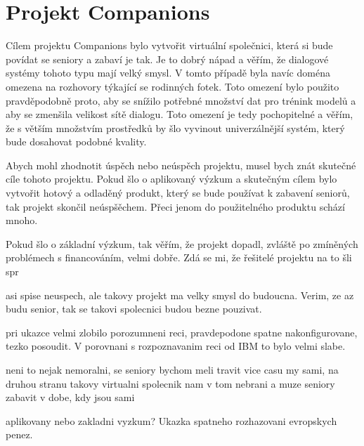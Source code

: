 \documentclass[12pt,a4paper]{report}
\begin{document}
\section*{Projekt Companions}

Cílem projektu Companions bylo vytvořit virtuální společnici, která si bude
povídat se seniory a zabaví je tak. Je to dobrý nápad a věřím, že dialogové
systémy tohoto typu mají velký smysl. V tomto případě byla navíc doména omezena
na rozhovory týkající se rodinných fotek. Toto omezení bylo použito
pravděpodobně proto, aby se snížilo potřebné množství dat pro trénink modelů a
aby se zmenšila velikost sítě dialogu. Toto omezení je tedy pochopitelné a
věřím, že s větším množstvím prostředků by šlo vyvinout univerzálnější systém,
který bude dosahovat podobné kvality.

Abych mohl zhodnotit úspěch nebo neúspěch projektu, musel bych znát skutečné
cíle tohoto projektu. Pokud šlo o aplikovaný výzkum a skutečným cílem bylo
vytvořit hotový a odladěný produkt, který se bude používat k zabavení seniorů,
tak projekt skončil neúspšěchem. Přeci jenom do použitelného produktu schází
mnoho.

Pokud šlo o základní výzkum, tak věřím, že projekt dopadl, zvláště po zmíněných 
problémech s financováním, velmi dobře. Zdá se mi, že řešitelé projektu 
na to šli spr


asi spise neuspech, ale takovy projekt ma velky smysl do budoucna. Verim, ze az budu
senior, tak se takovi spolecnici budou bezne pouzivat.

pri ukazce velmi zlobilo porozumneni reci, pravdepodone spatne nakonfigurovane, tezko posoudit.
V porovnani s rozpoznavanim reci od IBM to bylo velmi slabe. 

neni to nejak nemoralni, se seniory bychom meli travit vice casu my sami, na
druhou stranu takovy virtualni spolecnik nam v tom nebrani a muze seniory
zabavit v dobe, kdy jsou sami

aplikovany nebo zakladni vyzkum? Ukazka spatneho rozhazovani evropskych penez. 
\end{document}
